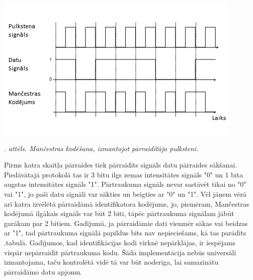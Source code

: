 \documentclass[12pt, a4paper, oneside, openright]{article}
\renewcommand{\thecimages}{\arabic{cimages}}
\begin{document}
\label{cimages:machester_2.png}
\vspace{10pt}
\begin{samepage}
\begin{center}
\includegraphics[width=0.8\columnwidth]{images/machester_2.png}
\begin{center}
\footnotesize{
\textit{\thecimages. attēls. Mančestras kodēšana, izmantojot pārraidītāja pulksteni.}}
\end{center}
\end{center}
\end{samepage}

Pirms katra skaitļa pārraides tiek pārraidīts signāls datu pārraides sākšanai. Piedāvātajā protokolā
tas ir 3 bitu ilgs zemas intensitātes signāls "0" un 1 bita augstas intensitātes signāls "1". Pārtraukuma signāls
nevar sastāvēt tikai no "0" vai "1", jo paši datu signāli var sākties un beigties ar "0" un "1". Vēl jāņem
vērā arī katra izvēlētā pārraidāmā identifikatora kodējums, jo, piemēram, Mančestras kodējumā ilgākais
signāls var būt 2 biti, tāpēc pārtraukuma signālam jābūt garākam par 2 bitiem. Gadījumā,
ja pārraidāmie dati vienmēr sākas vai beidzas ar "1", tad pārtraukuma signālā papildus bits nav nepieciešams, kā tas
parādīts .tabulā. Gadījumos, kad identifikācijas kodi virknē nepārklājas, ir iespējams
vispār nepārraidīt pārtraukuma kodu. Šāda implementācija nebūs universāli izmantojama, taču kontrolētā
vidē tā var būt noderīga, lai samazinātu pārraidāmo datu apjomu.
\end{document}
